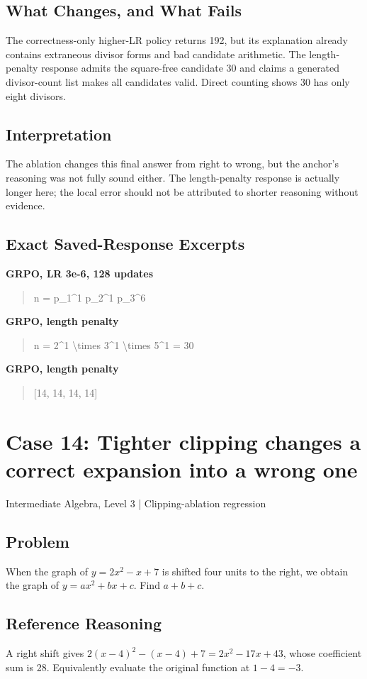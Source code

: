 \documentclass[10pt,letterpaper]{article}
\begin{document}
\subsection*{What Changes, and What Fails}
The correctness-only higher-LR policy returns 192, but its explanation already contains extraneous divisor forms and bad candidate arithmetic. The length-penalty response admits the square-free candidate 30 and claims a generated divisor-count list makes all candidates valid. Direct counting shows 30 has only eight divisors.
\subsection*{Interpretation}
The ablation changes this final answer from right to wrong, but the anchor's reasoning was not fully sound either. The length-penalty response is actually longer here; the local error should not be attributed to shorter reasoning without evidence.
\subsection*{Exact Saved-Response Excerpts}
\textbf{GRPO, LR 3e-6, 128 updates}
\begin{quote}\small\raggedright n = p\_1\textasciicircum{}1 p\_2\textasciicircum{}1 p\_3\textasciicircum{}6\end{quote}
\textbf{GRPO, length penalty}
\begin{quote}\small\raggedright n = 2\textasciicircum{}1 \textbackslash{}times 3\textasciicircum{}1 \textbackslash{}times 5\textasciicircum{}1 = 30\end{quote}
\textbf{GRPO, length penalty}
\begin{quote}\small\raggedright [14, 14, 14, 14]\end{quote}
\clearpage\section*{Case 14: Tighter clipping changes a correct expansion into a wrong one}
Intermediate Algebra, Level 3 | Clipping-ablation regression
\subsection*{Problem}
When the graph of $y = 2x^2 - x + 7$ is shifted four units to the right, we obtain the graph of $y = ax^2 + bx + c$.  Find $a + b + c$.
\subsection*{Reference Reasoning}
A right shift gives $2(x-4)^2-(x-4)+7=2x^2-17x+43$, whose coefficient sum is 28. Equivalently evaluate the original function at $1-4=-3$.
\end{document}
